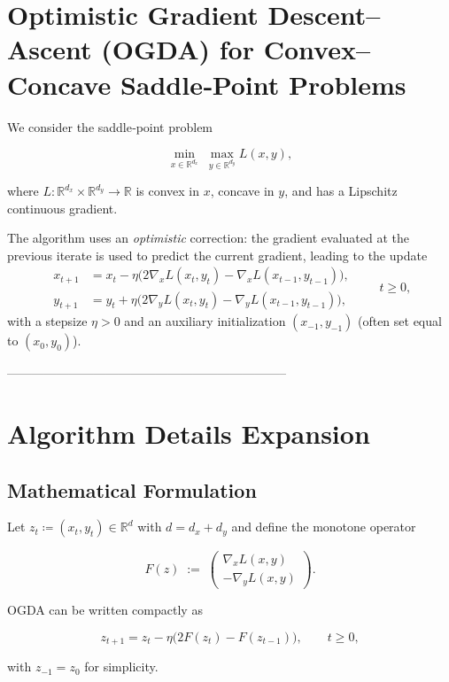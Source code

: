 \documentclass[11pt]{article}
\newcommand{\R}{\mathbb{R}}
\begin{document}
\section*{Optimistic Gradient Descent–Ascent (OGDA) for Convex–Concave Saddle‑Point Problems}

We consider the saddle‑point problem  

\[
\min_{x\in\R^{d_x}}\;\max_{y\in\R^{d_y}} L(x,y),
\]

where $L:\R^{d_x}\times\R^{d_y}\rightarrow\R$ is convex in $x$, concave in $y$, and has a Lipschitz continuous gradient.  

The algorithm uses an \emph{optimistic} correction: the gradient evaluated at the previous iterate is used to predict the current gradient, leading to the update
\[
\begin{aligned}
x_{t+1}&=x_t-\eta\bigl(2\nabla_x L(x_t,y_t)-\nabla_x L(x_{t-1},y_{t-1})\bigr),\\
y_{t+1}&=y_t+\eta\bigl(2\nabla_y L(x_t,y_t)-\nabla_y L(x_{t-1},y_{t-1})\bigr),
\end{aligned}
\qquad t\ge 0,
\]
with a stepsize $\eta>0$ and an auxiliary initialization $(x_{-1},y_{-1})$ (often set equal to $(x_0,y_0)$).

--------------------------------------------------------------------

\section*{Algorithm Details Expansion}

\subsection*{Mathematical Formulation}
Let $z_t\coloneqq (x_t,y_t)\in\R^{d}$ with $d=d_x+d_y$ and define the monotone operator  

\[
F(z)\;:=\;\begin{pmatrix}
\nabla_x L(x,y)\\[2mm]
-\nabla_y L(x,y)
\end{pmatrix}.
\]

OGDA can be written compactly as  

\[
z_{t+1}=z_t-\eta\bigl(2F(z_t)-F(z_{t-1})\bigr),\qquad t\ge0,
\tag{1}
\]

with $z_{-1}=z_0$ for simplicity.  
\end{document}
